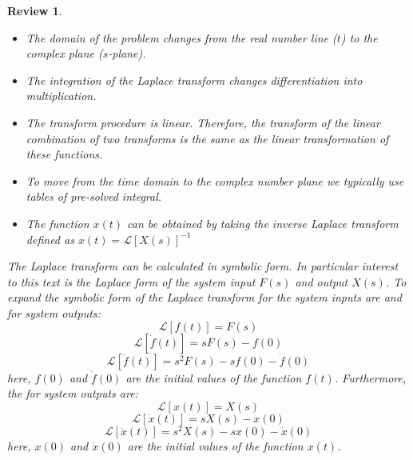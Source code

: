 \documentclass[12pt,letter]{article}
\numberwithin{ex}{section} %
\newtheorem{re}{Review}
\numberwithin{re}{section} %
\newenvironment{review}{\begin{mdframed}[middlelinewidth=2mm,roundcorner=20pt]\begin{re}\normalfont}{\end{re}\end{mdframed}}
\newcommand{\Laplace}[1]{\ensuremath{\mathcal{L}{\left[#1\right]}}}
\begin{document}
\begin{review}
		\begin{itemize}
			\item The domain of the problem changes from the real number line ($t$) to the complex plane ($s$-plane).
			\item The integration of the Laplace transform changes differentiation into multiplication.
			\item The transform procedure is linear. Therefore, the transform of the linear combination of two transforms is the same as the linear transformation of these functions. 
			\item To move from the time domain to the complex number plane we typically use tables of pre-solved integral. 
			\item The function $x(t)$ can be obtained by taking the inverse Laplace transform defined as $x(t) = \Laplace{X(s)}^{-1}$
		\end{itemize}

			The Laplace transform can be calculated in symbolic form. In particular interest to this text is the Laplace form of the system input $F(s)$ and output $X(s)$. To expand the symbolic form of the Laplace transform for the system inputs are 
			and for system outputs:
			\begin{equation}
				\label{eq:laplace_f}
				\Laplace{f(t)} = F(s)
			\end{equation}		
			\begin{equation}
				\label{eq:laplace_f'}
				\Laplace{\dot{f}(t)} = sF(s)-f(0)
			\end{equation}	
			\begin{equation}
				\label{eq:laplace_f''}
				\Laplace{\ddot{f}(t)} = s^2F(s)-sf(0) - \dot{f}(0)
			\end{equation}	
			here, $f(0)$ and $\dot{f}(0)$ are the initial values of the function $f(t)$.  Furthermore, the for system outputs are:
			\begin{equation}
				\label{eq:laplace_x}
				\Laplace{x(t)} = X(s)
			\end{equation}		
			\begin{equation}
				\label{eq:laplace_x'}
				\Laplace{\dot{x}(t)} = sX(s)-x(0)
			\end{equation}	
			\begin{equation}
				\label{eq:laplace_x''}
				\Laplace{\ddot{x}(t)} = s^2X(s)-sx(0) - \dot{x}(0)
			\end{equation}	
			here, $x(0)$ and $\dot{x}(0)$ are the initial values of the function $x(t)$. 		
	
\end{review}
\end{document}
